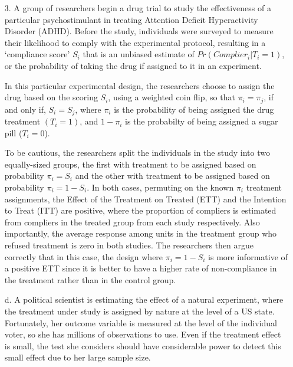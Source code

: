 \documentclass{article}
\begin{document}
\begin{itemize}

\item[3.] A group of researchers begin a drug trial to study the
  effectiveness of a particular psychostimulant in treating Attention
  Deficit Hyperactivity Disorder (ADHD).  Before the study,
  individuals were surveyed to measure their likelihood to comply with
  the experimental protocol, resulting in a `compliance score' $S_i$ that is
  an unbiased estimate of $Pr(Complier_i|T_i=1)$, or the probability
  of taking the drug if assigned to it in an experiment.
  \vspace{.5em}

  In this particular experimental design, the researchers choose to
  assign the drug based on the scoring $S_i$, using a weighted coin  flip, so that $\pi_i=\pi_j$, if and only if, $S_i=S_j$, where
  $\pi_i$ is the probability of being assigned the drug treatment
  $(T_i=1)$, and $1-\pi_i$ is the probabilty of being assigned a sugar
  pill ($T_i=0$).  
  \vspace{.5em}

To be cautious, the researchers split the
  individuals in the study into two equally-sized groups, the first
  with treatment to be assigned based on probability $\pi_i=S_i$ and
  the other with treatment to be assigned based on probability
  $\pi_i=1-S_i$.  In both cases, permuting on the known $\pi_i$ treatment
  assignments, the Effect of the Treatment on Treated
  (ETT) and the Intention to Treat (ITT) are positive, where the
  proportion of compliers is estimated from compliers in the treated
  group from each study respectively.  Also importantly, the average response
  among units in the treatment group who refused treatment is zero in
  both studies.  The researchers then argue correctly that in this case, the
  design where $\pi_i=1-S_i$ is more informative of a positive ETT
  since it is better to have a higher rate of non-compliance in the
  treatment rather than in the control group.

\item[d.]A political scientist is estimating the effect of a natural
  experiment, where the treatment under study is assigned by nature at
  the level of a US state. Fortunately, her outcome variable is
  measured at the level of the individual voter, so she has millions
  of observations to use. Even if the treatment effect is small, the
  test she considers should have considerable power to detect this
  small effect due to her large sample size.

\end{itemize}
\end{document}
